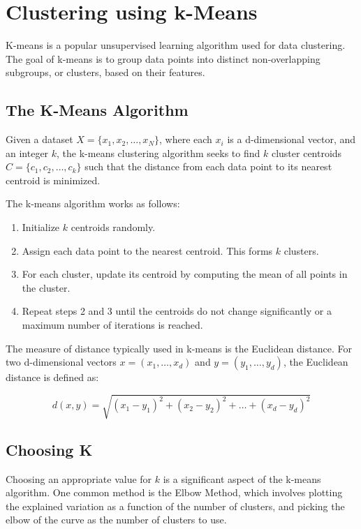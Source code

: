 \chapter{Clustering using k-Means}

K-means is a popular unsupervised learning algorithm used for data
clustering. The goal of k-means is to group data points into distinct
non-overlapping subgroups, or clusters, based on their features.

\section{The K-Means Algorithm}

Given a dataset $X = \{x_1, x_2, \ldots, x_N\}$, where each $x_i$ is a
d-dimensional vector, and an integer $k$, the k-means clustering
algorithm seeks to find $k$ cluster centroids $C = \{c_1, c_2, \ldots,
c_k\}$ such that the distance from each data point to its nearest
centroid is minimized.

The k-means algorithm works as follows:

\begin{enumerate}
    \item Initialize $k$ centroids randomly.
    \item Assign each data point to the nearest centroid. This forms $k$ clusters.
    \item For each cluster, update its centroid by computing the mean of all points in the cluster.
    \item Repeat steps 2 and 3 until the centroids do not change significantly or a maximum number of iterations is reached.
\end{enumerate}

The measure of distance typically used in k-means is the Euclidean
distance. For two d-dimensional vectors $x = (x_1, \ldots, x_d)$ and
$y = (y_1, \ldots, y_d)$, the Euclidean distance is defined as:

\begin{equation}
d(x, y) = \sqrt{(x_1 - y_1)^2 + (x_2 - y_2)^2 + \ldots + (x_d - y_d)^2}
\end{equation}

\section{Choosing K}

Choosing an appropriate value for $k$ is a significant aspect of the
k-means algorithm. One common method is the Elbow Method, which
involves plotting the explained variation as a function of the number
of clusters, and picking the elbow of the curve as the number of
clusters to use.

